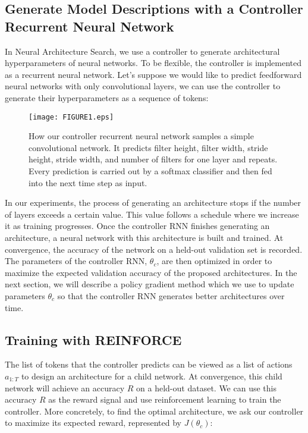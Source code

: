 \documentclass{article} \usepackage{iclr2017_conference,times}
\begin{document}
\fi


\subsection{Generate Model Descriptions with a Controller Recurrent Neural Network}
\label{sec:Controller_RNN}

In Neural Architecture Search, we use a controller to generate architectural hyperparameters of neural networks. To be flexible, the controller is implemented as a recurrent neural network. Let's suppose we would like to predict feedforward neural networks with only convolutional layers, we can use the controller to generate their hyperparameters as a sequence of tokens:  




\begin{figure}[h!]
\begin{center}
\centerline{\texttt{[image: FIGURE1.eps]}}
\caption{How our controller recurrent neural network samples a simple convolutional network. It predicts filter height, filter width, stride height, stride width, and number of filters for one layer and repeats. Every prediction is carried out by a softmax classifier and then fed into the next time step as input.}
\label{figure:Controller_RNN}
\end{center}
\end{figure}








In our experiments, the process of generating an architecture stops if the number of layers exceeds a certain value. This value follows a schedule where we increase it as training progresses. Once the controller RNN finishes generating an architecture, a neural network  with this architecture is built and trained. At convergence, the accuracy of the network on a held-out validation set is recorded. The parameters of the controller RNN, $\theta_c$, are then optimized in order to maximize the expected validation accuracy of the proposed architectures. In the next section, we will describe a policy gradient method which we use to update parameters $\theta_c$ so that the controller RNN generates better architectures over time.




\subsection{Training with REINFORCE}
The list of tokens that the controller predicts can be viewed as a list of actions $a_{1:T}$ to design an architecture for a child network. At convergence, this child network will achieve an accuracy $R$ on a held-out dataset. We can use this accuracy $R$ as the reward signal and use reinforcement learning to train the controller. More concretely, to find the optimal architecture, we ask our controller to maximize its expected reward, represented by $J(\theta_c)$:
\end{document}
